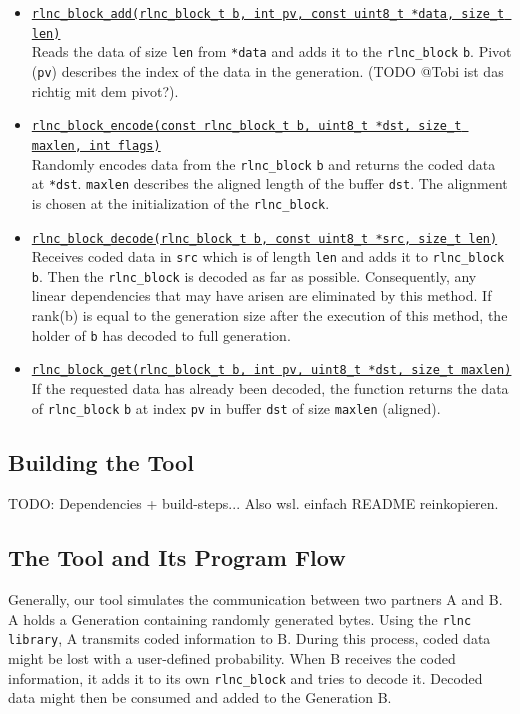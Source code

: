 \documentclass[a4paper,english,10pt]{tumarticle}
\begin{document}
\begin{itemize}
    \item \underline{\texttt{rlnc\_block\_add(rlnc\_block\_t b, int pv, const uint8\_t *data, size\_t len)}}\\
    Reads the data of size \texttt{len} from \texttt{*data} and adds it to the \texttt{rlnc\_block} \texttt{b}. Pivot (\texttt{pv}) describes the index of the data in the generation. 
    (TODO @Tobi ist das richtig mit dem pivot?). 

    \item \underline{\texttt{rlnc\_block\_encode(const rlnc\_block\_t b, uint8\_t *dst, size\_t maxlen, int flags)}}\\
    Randomly encodes data from the \texttt{rlnc\_block} \texttt{b} and returns the coded data at \texttt{*dst}. 
    \texttt{maxlen} describes the aligned length of the buffer \texttt{dst}. The alignment is chosen at the initialization of the \texttt{rlnc\_block}.
    
    \item \underline{\texttt{rlnc\_block\_decode(rlnc\_block\_t b, const uint8\_t *src, size\_t len)}}\\
    Receives coded data in \texttt{src} which is of length \texttt{len} and adds it to \texttt{rlnc\_block} \texttt{b}. 
    Then the \texttt{rlnc\_block} is decoded as far as possible. 
    Consequently, any linear dependencies that may have arisen are eliminated by this method. If rank(b) is 
    equal to the generation size after the execution of this method, the holder of \texttt{b} has decoded to full generation.

    \item \underline{\texttt{rlnc\_block\_get(rlnc\_block\_t b, int pv, uint8\_t *dst, size\_t maxlen)}}\\
    If the requested data has already been decoded, the function returns the data of \texttt{rlnc\_block} \texttt{b} at index \texttt{pv} in buffer 
    \texttt{dst} of size \texttt{maxlen} (aligned).
  \end{itemize}

\subsection{Building the Tool}\label{app:build}
TODO: Dependencies + build-steps... Also wsl. einfach README reinkopieren. 

\subsection{The Tool and Its Program Flow}\label{sec:tool}
Generally, our tool simulates the communication between two partners A and B. 
A holds a Generation containing randomly generated bytes. Using the \texttt{rlnc library}, A transmits coded information to B. 
During this process, coded data might be lost with a user-defined probability. When B receives the coded information, 
it adds it to its own \texttt{rlnc\_block} and tries to decode it. Decoded data might then be consumed and added to the Generation B.
\end{document}
